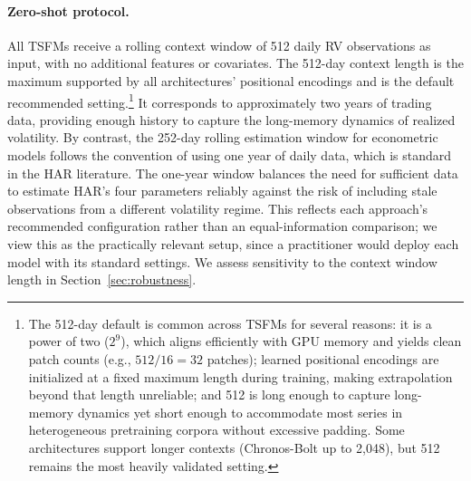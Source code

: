 \documentclass[12pt]{article}
\begin{document}
\paragraph{Zero-shot protocol.}
All TSFMs receive a rolling context window of 512 daily RV observations as input, with no additional features or covariates. The 512-day context length is the maximum supported by all architectures' positional encodings and is the default recommended setting.\footnote{The 512-day default is common across TSFMs for several reasons: it is a power of two ($2^9$), which aligns efficiently with GPU memory and yields clean patch counts (e.g., $512 / 16 = 32$ patches); learned positional encodings are initialized at a fixed maximum length during training, making extrapolation beyond that length unreliable; and 512 is long enough to capture long-memory dynamics yet short enough to accommodate most series in heterogeneous pretraining corpora without excessive padding. Some architectures support longer contexts (Chronos-Bolt up to 2,048), but 512 remains the most heavily validated setting.} It corresponds to approximately two years of trading data, providing enough history to capture the long-memory dynamics of realized volatility. By contrast, the 252-day rolling estimation window for econometric models follows the convention of using one year of daily data, which is standard in the HAR literature. The one-year window balances the need for sufficient data to estimate HAR's four parameters reliably against the risk of including stale observations from a different volatility regime. This reflects each approach's recommended configuration rather than an equal-information comparison; we view this as the practically relevant setup, since a practitioner would deploy each model with its standard settings. We assess sensitivity to the context window length in Section~\ref{sec:robustness}.
\end{document}
